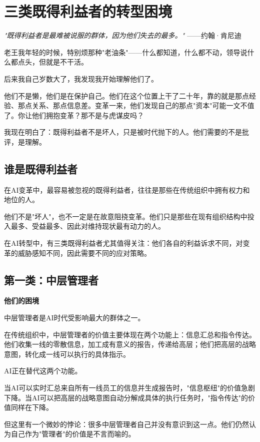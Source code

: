 \chapter{三类既得利益者的转型困境}


\textit{"既得利益者是最难被说服的群体，因为他们失去的最多。"}
——约翰·肯尼迪


老王我年轻的时候，特别烦那种"老油条"——什么都知道，什么都不动，领导说什么都点头，但就是不干活。

后来我自己岁数大了，我发现我开始理解他们了。

他们不是懒，他们是在保护自己。他们在这个位置上干了二十年，靠的就是那点经验、那点关系、那点信息差。变革一来，他们发现自己的那点"资本"可能一文不值了。你让他们拥抱变革？那不是与虎谋皮吗？

我现在明白了：既得利益者不是坏人，只是被时代抛下的人。他们需要的不是批评，是理解。

\section{谁是既得利益者}


在AI变革中，最容易被忽视的既得利益者，往往是那些在传统组织中拥有权力和地位的人。

他们不是"坏人"，也不一定是在故意阻挠变革。他们只是那些在现有组织结构中投入最多、受益最多、因此对维持现状最有动力的人。

在AI转型中，有三类既得利益者尤其值得关注：他们各自的利益诉求不同，对变革的威胁感知不同，因此需要不同的应对策略。

\section{第一类：中层管理者}


\textbf{他们的困境}

中层管理者是AI时代受影响最大的群体之一。

在传统组织中，中层管理者的价值主要体现在两个功能上：信息汇总和指令传达。他们收集一线的零散信息，加工成有意义的报告，传递给高层；他们把高层的战略意图，转化成一线可以执行的具体指示。

AI正在替代这两个功能。

当AI可以实时汇总来自所有一线员工的信息并生成报告时，"信息枢纽"的价值急剧下降。当AI可以把高层的战略意图自动分解成具体的执行任务时，"指令传达"的价值同样在下降。

但这里有一个微妙的悖论：很多中层管理者自己并没有意识到这一点。他们仍然认为自己作为"管理者"的价值是不言而喻的。

